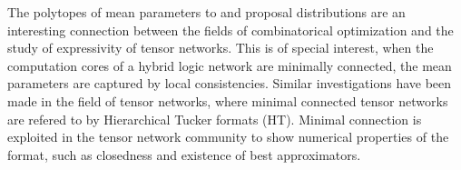 The polytopes of mean parameters to \HybridLogicNetworks{} and proposal distributions are an interesting connection between the fields of combinatorical optimization and the study of expressivity of tensor networks.
This is of special interest, when the computation cores of a hybrid logic network are minimally connected, the mean parameters are captured by local consistencies.
Similar investigations have been made in the field of tensor networks, where minimal connected tensor networks are refered to by Hierarchical Tucker formats (HT).
Minimal connection is exploited in the tensor network community to show numerical properties of the format, such as closedness and existence of best approximators.














